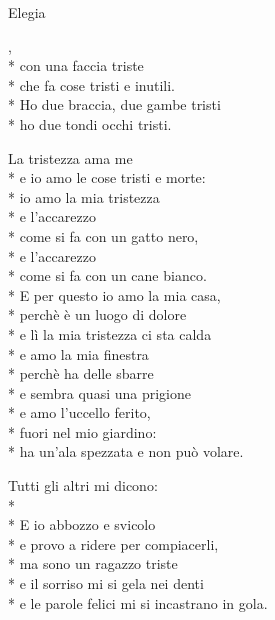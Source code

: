 \documentclass[12pt]{book}
\begin{document}
\begin{poem}{Elegia}{}
\begin{changemargin}{-1cm}{-2cm}
\settowidth{\versewidth}{non meno è ciò che meriti.}

\begin{altverse}
,\\*
con una faccia triste\\*
che fa cose tristi e inutili.\\*
Ho due braccia, due gambe tristi\\*
ho due tondi occhi tristi.
\end{altverse}

\begin{altverse}
La tristezza ama me\\*
e io amo le cose tristi e morte:\\*
io amo la mia tristezza\\*
e l'accarezzo\\*
come si fa con un gatto nero,\\*
e l'accarezzo\\*
come si fa con un cane bianco.\\*
E per questo io amo la mia casa,\\*
perchè è un luogo di dolore\\*
e lì la mia tristezza ci sta calda\\*
e amo la mia finestra\\*
perchè ha delle sbarre\\*
e sembra quasi una prigione\\*
e amo l'uccello ferito,\\*
fuori nel mio giardino:\\*
ha un'ala spezzata e non può volare.
\end{altverse}

\begin{altverse}
Tutti gli altri mi dicono:\\*
\\*
E io abbozzo e svicolo\\*
e provo a ridere per compiacerli,\\*
ma sono un ragazzo triste\\*
e il sorriso mi si gela nei denti\\*
e le parole felici mi si incastrano in gola.
\end{altverse}


\end{changemargin}
\end{poem}
\end{document}
